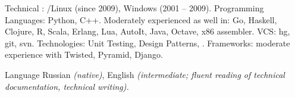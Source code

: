 \documentclass[unicode, 10pt, a4paper, oneside, fleqn]{article}
\begin{document}


\inlineheadsection  %
    {Technical}
    {
        : /Linux (since 2009), Windows (2001 -- 2009).
        Programming Languages: Python, C++.
        Moderately experienced as well in: Go, Haskell, Clojure, R, Scala,
        Erlang, Lua, AutoIt, Java, Octave, x86 assembler.
        VCS: hg, git, svn.
        Technologies: Unit Testing, Design Patterns, .
        Frameworks: moderate experience with Twisted, Pyramid, Django.
    }

\inlineheadsection
    {Language}
    {
        Russian \emph{(native)}, English \emph{(intermediate; fluent reading of
        technical documentation, technical writing).}
    }

%
%
\end{document}
